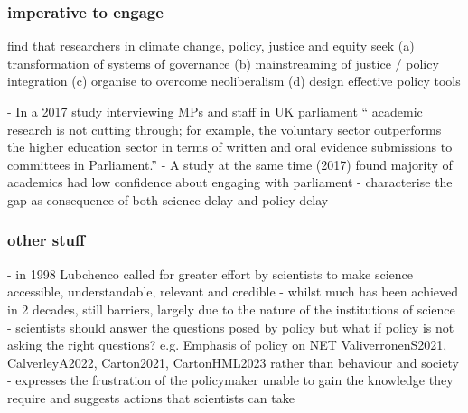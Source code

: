 \subsubsection{imperative to engage}


\cite{CairneyTS2023} find that researchers in climate change, policy, justice and equity seek (a) transformation of systems of governance (b) mainstreaming of justice / policy integration (c) organise to overcome neoliberalism (d) design effective policy tools

\cite{KennyRHTB2017} - In a 2017 study interviewing MPs and staff in UK parliament `` academic research is not cutting through; for example, the voluntary sector outperforms the higher education sector in terms of written and oral evidence submissions to committees in Parliament.''
\cite{KEU2021perceptions} - A study at the same time (2017) found majority of academics had low confidence about engaging with parliament
\cite{KarlssonG2020} - characterise the gap as consequence of both science delay and policy delay



\subsubsection{other stuff}
\cite{LubchencoR2020} - in 1998 Lubchenco called for greater effort by scientists to make science accessible, understandable, relevant and credible - whilst much has been achieved in 2 decades, still barriers, largely due to the nature of the institutions of science
\cite{Gerber2023} - scientists should answer the questions posed by policy but what if policy is not asking the right questions? e.g. Emphasis of policy on NET ValiverronenS2021, CalverleyA2022, Carton2021, CartonHML2023 rather than behaviour and society
\cite{Bisbal2024} - expresses the frustration of the policymaker unable to gain the knowledge they require and suggests actions that scientists can take 


